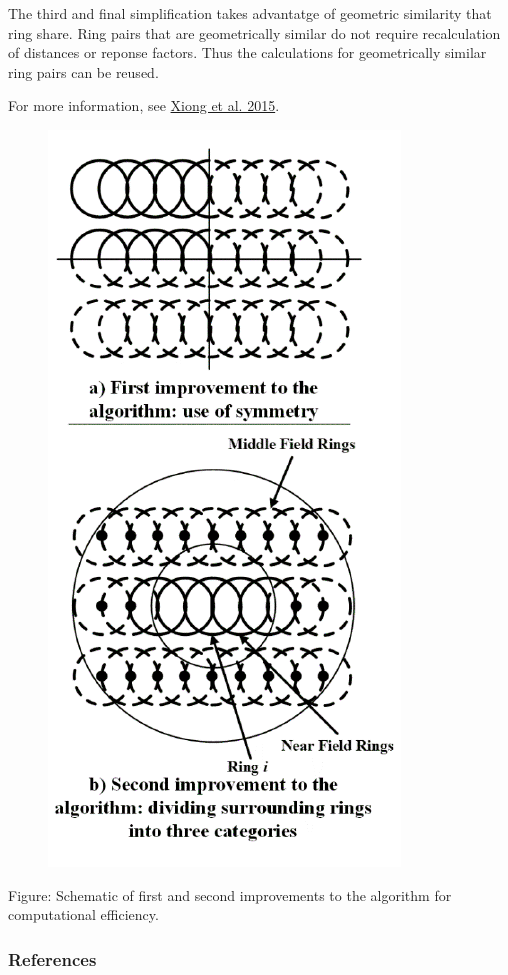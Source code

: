 The third and final simplification takes advantatge of geometric similarity that ring share. Ring pairs that are geometrically similar do not require recalculation of distances or reponse factors. Thus the calculations for geometrically similar ring pairs can be reused.

For more information, see \protect\hyperlink{SlinkyReferenceXiong}{Xiong et al. 2015}.

\begin{figure}[htbp]
\centering
\includegraphics{media/image8001.png}
\caption{}
\end{figure}

Figure: Schematic of first and second improvements to the algorithm for computational efficiency.

\subsubsection{References}\label{references-3-003}

